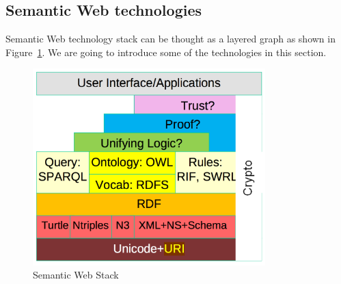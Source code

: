 \subsection{Semantic Web technologies}

Semantic Web technology stack can be thought as a layered graph as shown in Figure~\ref{fig:SemanticWebStack}. We are going to introduce some of the technologies in this section.

\begin{figure}[H]
\centering
\includegraphics[width=90mm]{images/semantic-web-stack.png}
\caption{Semantic Web Stack\protect\footnotemark}
\label{fig:SemanticWebStack}
\end{figure}


